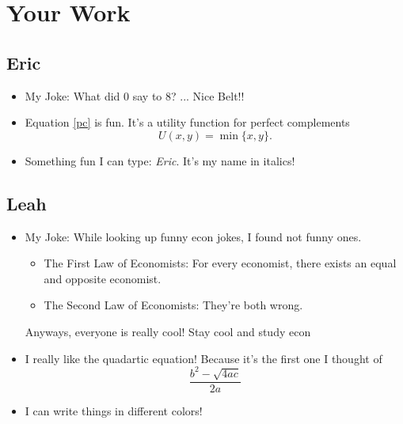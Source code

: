 \documentclass{article}
\begin{document}
	\section{Your Work}
	
	\subsection{Eric}
	
	\begin{itemize}
		\item My Joke: What did $0$ say to $8$? ... Nice Belt!!
		\item Equation \ref{pc} is fun. It's a utility function for perfect complements
		\begin{equation}\label{pc}
		U(x,y) = \min\{x,y\}.
		\end{equation}
		\item Something fun I can type: \emph{Eric}. It's my name in italics!
	\end{itemize}
	
	
	\subsection{Leah}
	
	\begin{itemize}
		\item My Joke: 
		While looking up funny econ jokes, I found not funny ones.
		\begin{itemize}
			\item The First Law of Economists: For every economist, there exists an equal and opposite economist.
			\item The Second Law of Economists: They’re both wrong.
		\end{itemize} 
		Anyways, everyone is really cool! Stay cool and study econ 
		
		
		\item I really like the {quadartic} equation! Because it's the first one I thought of
		\begin{equation} \label{quadratic}
		\frac{b^2-\sqrt{4ac}}{2a}
		\end{equation}
		\color{blue}
		\item I can write things in different colors! 
	\end{itemize}

	
	
	
\end{document}
